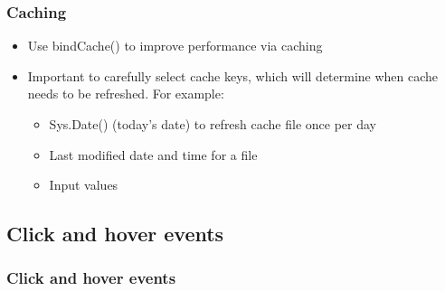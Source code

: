 \documentclass[
	11pt, %
]{beamer}
\begin{document}
\begin{frame}
	\frametitle{Caching}
	
	\begin{itemize}
		\item Use bindCache() to improve performance via caching
		\item Important to carefully select cache keys, which will determine when cache needs to be refreshed. For example:
	\begin{itemize}
		\item Sys.Date() (today's date) to refresh cache file once per day
		\item Last modified date and time for a file
		\item Input values
	\end{itemize}
	\end{itemize}
\end{frame}

\subsection{Click and hover events}

\begin{frame}
	\frametitle{Click and hover events}
\end{frame}


\end{document}
